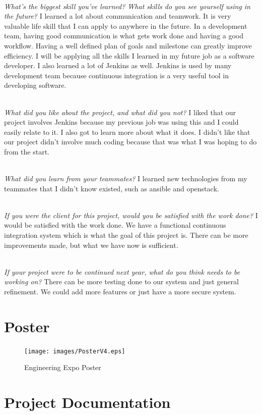 \documentclass[10pt,letterpaper,onecolumn,draftclsnofoot]{IEEEtran}
\begin{document}
\textit{\\What's the biggest skill you've learned? What skills do you see yourself using in the future?}
I learned a lot about communication and teamwork. It is very valuable life skill that I can apply to anywhere in the future. In a development team, having good communication is what gets work done and having a good workflow. Having a well defined plan of goals and milestone can greatly improve efficiency. I will be applying all the skills I learned in my future job as a software developer. I also learned a lot of Jenkins as well. Jenkins is used by many development team because continuous integration is a very useful tool in developing software.

\textit{\\What did you like about the project, and what did you not?}
I liked that our project involves Jenkins because my previous job was using this and I could easily relate to it. I also got to learn more about what it does. I didn't like that our project didn't involve much coding because that was what I was hoping to do from the start.

\textit{\\What did you learn from your teammates?}
I learned new technologies from my teammates that I didn't know existed, such as ansible and openstack.

\textit{\\If you were the client for this project, would you be satisfied with the work done?}
I would be satisfied with the work done. We have a functional continuous integration system which is what the goal of this project is. There can be more improvements made, but what we have now is sufficient.

\textit{\\If your project were to be continued next year, what do you think needs to be working on?}
There can be more testing done to our system and just general refinement. We could add more features or just have a more secure system.\\

\section{Poster}
\begin{figure}[H]
  \texttt{[image: images/PosterV4.eps]}
  \caption{Engineering Expo Poster}
\end{figure}

%
\section{Project Documentation}
\end{document}
